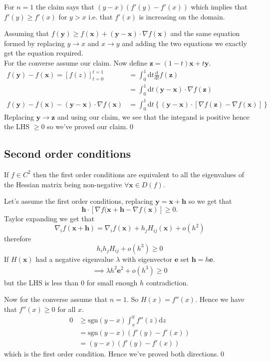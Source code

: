 \documentclass{article}
\begin{document}
For $ n=1 $ the claim says that $ (y-x)(f'(y)-f'(x)) $ which implies that $ f'(y)\ge f'(x) $ for $ y>x $ i.e. that $ f'(x) $ is increasing on the domain.\par
\pf Assuming that $ f(\mathbf y)\ge f(\mathbf x) +(\mathbf y-\mathbf x)\cdot\nabla f(\mathbf x) $ and the same equation formed by replacing $ y\to x $ and $ x\to y $ and adding the two equations we exactly get the equation required.\\
For the converse assume our claim. Now define $ \mathbf z = (1-t)\mathbf x + t\mathbf y $.
\begin{align*}
	f(\mathbf y) - f(\mathbf x)=\left[f(z)\right]^{t=1}_{t=0}&=\int_0^1\mathrm dt \frac{\mathrm d}{\mathrm dt}f(\mathbf z)\\
								 &=\int_0^1\mathrm dt(\mathbf y-\mathbf x)\cdot\nabla f(\mathbf z) \\
	f(\mathbf y)-f(\mathbf x)-(\mathbf y-\mathbf x)\cdot\nabla f(\mathbf x)&= \int_0^1\mathrm dt\left\{(\mathbf y-\mathbf x)\cdot\left[\nabla f(\mathbf z)-\nabla f(\mathbf x)\right]\right\}							
\end{align*}
Replacing $ \mathbf y\to\mathbf z $ and using our claim, we see that the integand is positive hence the LHS $ \ge 0 $ so we've proved our claim.\qed
\subsection{Second order conditions}
\begin{claim}
  If $ f\in C^2 $ then the first order conditions are equivalent to all the eigenvalues of the Hessian matrix being non-negative $ \forall \mathbf x\in D(f) $.
\end{claim}
\pf Let's assume the first order conditions, replacing $ \mathbf y = \mathbf x +\mathbf h $ so we get that 
\[
	\mathbf h\cdot[\nabla f(\mathbf x+\mathbf h-\nabla f(\mathbf x)]\ge 0.
\]
Taylor expanding we get that
\[
	\nabla_i f(\mathbf x+\mathbf h)=\nabla_i f(\mathbf x)+h_jH_{ij}(\mathbf x)+o(h^2)
\]
therefore 
\[
	h_ih_jH_{ij}+o(h^3)\ge 0
\]
If $ H(\mathbf x) $ had a negative eigenvalue $ \lambda $ with eigenvector $ \mathbf e $ set $ \mathbf h=h\mathbf e $.
\begin{align*}
  \implies \lambda h^2\mathbf e^2+o(h^3)\ge 0
\end{align*}
but the LHS is less than $ 0 $ for small enough $ h $ contradiction.\par
Now for the converse assume that $ n=1 $. So $ H(x)=f''(x) $. Hence we have that $ f''(x)\ge 0 $ for all $ x $.
\begin{align*}
	0&\ge \mathrm{sgn}(y-x)\int_x^yf''(z)\mathrm dz\\
	 &=\mathrm{sgn}(y-x)(f'(y)-f'(x))\\
	 &= (y-x)(f'(y)-f'(x))
\end{align*}
which is the first order condition. Hence we've proved both directions.\qed
\end{document}
